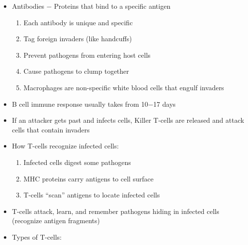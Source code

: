\documentclass[12pt]{article}
\begin{document}
\begin{itemize}
\begin{enumerate}
   \end{enumerate}

 \item Antibodies $-$ Proteins that bind to a specific antigen

   \begin{enumerate}

     \item Each antibody is unique and specific

     \item Tag foreign invaders (like handcuffs)

     \item Prevent pathogens from entering host cells

     \item Cause pathogens to clump together

     \item Macrophages are non-specific white blood cells that engulf invaders

   \end{enumerate}

 \item B cell immune response usually takes from 10$-$17 days

 \item If an attacker gets past and infects cells, Killer T-cells are released and attack cells that contain invaders

 \item How T-cells recognize infected cells:

   \begin{enumerate}

     \item Infected cells digest some pathogens

     \item MHC proteins carry antigens to cell surface

     \item T-cells ``scan'' antigens to locate infected cells

   \end{enumerate}

 \item T-cells attack, learn, and remember pathogens hiding in infected cells (recognize antigen fragments)

 \item Types of T-cells:

   \begin{enumerate}


\end{enumerate}
\end{itemize}
\end{document}
